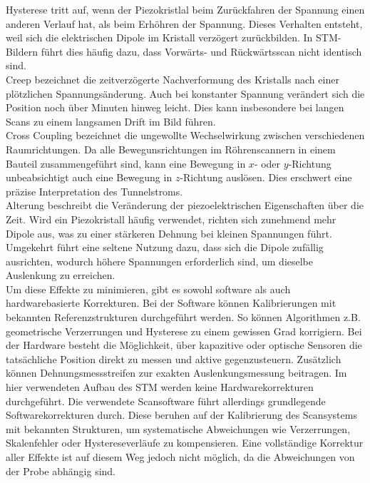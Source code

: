 Hysterese tritt auf, wenn der Piezokristlal beim Zurückfahren der Spannung einen anderen Verlauf hat, als beim Erhöhren der Spannung.
Dieses Verhalten entsteht, weil sich die elektrischen Dipole im Kristall verzögert zurückbilden. In STM-Bildern führt dies häufig dazu, dass Vorwärts- und Rückwärtsscan nicht identisch sind.\\

Creep bezeichnet die zeitverzögerte Nachverformung des Kristalls nach einer plötzlichen Spannungsänderung. Auch bei konstanter Spannung verändert sich die Position noch über Minuten hinweg leicht. 
Dies kann insbesondere bei langen Scans zu einem langsamen Drift im Bild führen.\\

Cross Coupling bezeichnet die ungewollte Wechselwirkung zwischen verschiedenen Raumrichtungen. 
Da alle Bewegunsrichtungen im Röhrenscannern in einem Bauteil zusammengeführt sind, kann eine Bewegung in $x$- oder $y$-Richtung unbeabsichtigt auch eine Bewegung in $z$-Richtung auslösen. 
Dies erschwert eine präzise Interpretation des Tunnelstroms.\\

Alterung beschreibt die Veränderung der piezoelektrischen Eigenschaften über die Zeit. Wird ein Piezokristall häufig verwendet, richten sich zunehmend mehr Dipole aus, was zu einer stärkeren Dehnung bei kleinen Spannungen führt. Umgekehrt führt eine seltene Nutzung dazu, dass sich die Dipole zufällig ausrichten, wodurch höhere Spannungen erforderlich sind, um dieselbe Auslenkung zu erreichen.\\

Um diese Effekte zu minimieren, gibt es sowohl software als auch hardwarebasierte Korrekturen.
Bei der Software können Kalibrierungen mit bekannten Referenzstrukturen durchgeführt werden.
So können Algorithmen z.B. geometrische Verzerrungen und Hysterese zu einem gewissen Grad korrigiern.
Bei der Hardware besteht die Möglichkeit, über kapazitive oder optische Sensoren die tatsächliche Position direkt zu messen und aktive gegenzusteuern.
Zusätzlich können Dehnungsmessstreifen zur exakten Auslenkungsmessung beitragen. 
Im hier verwendeten Aufbau des STM werden keine Hardwarekorrekturen durchgeführt. 
Die verwendete Scansoftware führt allerdings grundlegende Softwarekorrekturen durch. 
Diese  beruhen auf der Kalibrierung des Scansystems mit bekannten Strukturen, um systematische Abweichungen wie Verzerrungen, Skalenfehler oder Hystereseverläufe zu kompensieren. 
Eine vollständige Korrektur aller Effekte ist auf diesem Weg jedoch nicht möglich, da die Abweichungen von der Probe abhängig sind.


